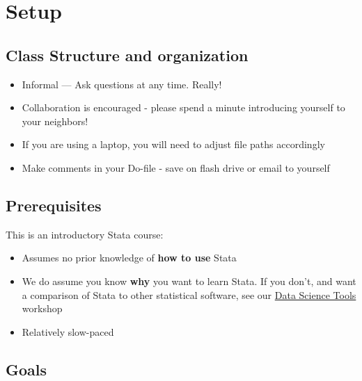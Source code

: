 \documentclass[
]{book}
\providecommand{\tightlist}{%
  \setlength{\itemsep}{0pt}\setlength{\parskip}{0pt}}
\begin{document}
\hypertarget{setup-6}{%
\section{Setup}\label{setup-6}}

\hypertarget{class-structure-and-organization}{%
\subsection{Class Structure and organization}\label{class-structure-and-organization}}

\begin{itemize}
\tightlist
\item
  Informal --- Ask questions at any time. Really!
\item
  Collaboration is encouraged - please spend a minute introducing yourself to your neighbors!
\item
  If you are using a laptop, you will need to adjust file paths accordingly
\item
  Make comments in your Do-file - save on flash drive or email to yourself
\end{itemize}

\hypertarget{prerequisites-6}{%
\subsection{Prerequisites}\label{prerequisites-6}}

This is an introductory Stata course:

\begin{itemize}
\tightlist
\item
  Assumes no prior knowledge of \textbf{how to use} Stata
\item
  We do assume you know \textbf{why} you want to learn Stata. If you don't, and want a comparison of Stata to other statistical software, see our \href{./DataScienceTools.html}{Data Science Tools} workshop
\item
  Relatively slow-paced
\end{itemize}

\hypertarget{goals-5}{%
\subsection{Goals}\label{goals-5}}
\end{document}
